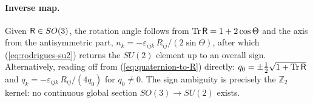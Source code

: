 \documentclass[conference]{IEEEtran}
\begin{document}
\begin{appendix}
\paragraph{Inverse map.}
Given ${\sf R}\in SO(3)$, the rotation angle follows from $\mathrm{Tr}\,{\sf R} = 1 + 2\cos\Theta$
and the axis from the antisymmetric part,
$n_k = -\varepsilon_{ijk}\,R_{ij}/(2\sin\Theta)$, after which (\ref{eq:rodrigues-su2})
returns the $SU(2)$ element up to an overall sign.
Alternatively, reading off from (\ref{eq:quaternion-to-R}) directly:
$q_0 = \pm\tfrac{1}{2}\sqrt{1+\mathrm{Tr}\,{\sf R}}$ and
$q_k = -\varepsilon_{ijk}\,R_{ij}/(4q_0)$ for $q_0\neq 0$.
The sign ambiguity is precisely the $\mathbb{Z}_2$ kernel: no continuous global
section $SO(3)\to SU(2)$ exists.


\end{appendix}
\end{document}
